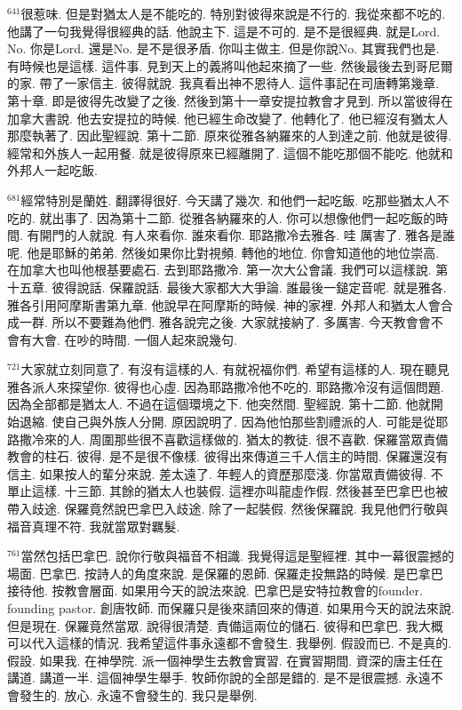 \documentclass{book}
\begin{document}
$^{641}$很惹味.
但是對猶太人是不能吃的.
特別對彼得來說是不行的.
我從來都不吃的.
他講了一句我覺得很經典的話.
他說主下.
這是不可的.
是不是很經典.
就是Lord.
No.
你是Lord.
還是No.
是不是很矛盾.
你叫主做主.
但是你說No.
其實我們也是.
有時候也是這樣.
這件事.
見到天上的義將叫他起來摘了一些.
然後最後去到哥尼爾的家.
帶了一家信主.
彼得就說.
我真看出神不恩待人.
這件事記在司唐轉第幾章.
第十章.
即是彼得先改變了之後.
然後到第十一章安提拉教會才見到.
所以當彼得在加拿大書說.
他去安提拉的時候.
他已經生命改變了.
他轉化了.
他已經沒有猶太人那麼執著了.
因此聖經說.
第十二節.
原來從雅各納羅來的人到達之前.
他就是彼得.
經常和外族人一起用餐.
就是彼得原來已經離開了.
這個不能吃那個不能吃.
他就和外邦人一起吃飯.

$^{681}$經常特別是蘭姓.
翻譯得很好.
今天講了幾次.
和他們一起吃飯.
吃那些猶太人不吃的.
就出事了.
因為第十二節.
從雅各納羅來的人.
你可以想像他們一起吃飯的時間.
有開門的人就說.
有人來看你.
誰來看你.
耶路撒冷去雅各.
哇 厲害了.
雅各是誰呢.
他是耶穌的弟弟.
然後如果你比對視頻.
轉他的地位.
你會知道他的地位崇高.
在加拿大也叫他根基要處石.
去到耶路撒冷.
第一次大公會議.
我們可以這樣說.
第十五章.
彼得說話.
保羅說話.
最後大家都大大爭論.
誰最後一鎚定音呢.
就是雅各.
雅各引用阿摩斯書第九章.
他說早在阿摩斯的時候.
神的家裡.
外邦人和猶太人會合成一群.
所以不要難為他們.
雅各說完之後.
大家就接納了.
多厲害.
今天教會會不會有大會.
在吵的時間.
一個人起來說幾句.

$^{721}$大家就立刻同意了.
有沒有這樣的人.
有就祝福你們.
希望有這樣的人.
現在聽見雅各派人來探望你.
彼得也心虛.
因為耶路撒冷他不吃的.
耶路撒冷沒有這個問題.
因為全部都是猶太人.
不過在這個環境之下.
他突然間.
聖經說.
第十二節.
他就開始退縮.
使自己與外族人分開.
原因說明了.
因為他怕那些割禮派的人.
可能是從耶路撒冷來的人.
周圍那些很不喜歡這樣做的.
猶太的教徒.
很不喜歡.
保羅當眾責備教會的柱石.
彼得.
是不是很不像樣.
彼得出來傳道三千人信主的時間.
保羅還沒有信主.
如果按人的輩分來說.
差太遠了.
年輕人的資歷那麼淺.
你當眾責備彼得.
不單止這樣.
十三節.
其餘的猶太人也裝假.
這裡亦叫龍虛作假.
然後甚至巴拿巴也被帶入歧途.
保羅竟然說巴拿巴入歧途.
除了一起裝假.
然後保羅說.
我見他們行敬與福音真理不符.
我就當眾對羈髮.

$^{761}$當然包括巴拿巴.
說你行敬與福音不相識.
我覺得這是聖經裡.
其中一幕很震撼的場面.
巴拿巴.
按詩人的角度來說.
是保羅的恩師.
保羅走投無路的時候.
是巴拿巴接待他.
按教會層面.
如果用今天的說法來說.
巴拿巴是安特拉教會的founder.
founding pastor.
創唐牧師.
而保羅只是後來請回來的傳道.
如果用今天的說法來說.
但是現在.
保羅竟然當眾.
說得很清楚.
責備這兩位的儲石.
彼得和巴拿巴.
我大概可以代入這樣的情況.
我希望這件事永遠都不會發生.
我舉例.
假設而已.
不是真的.
假設.
如果我.
在神學院.
派一個神學生去教會實習.
在實習期間.
資深的唐主任在講道.
講道一半.
這個神學生舉手.
牧師你說的全部是錯的.
是不是很震撼.
永遠不會發生的.
放心.
永遠不會發生的.
我只是舉例.
\end{document}
